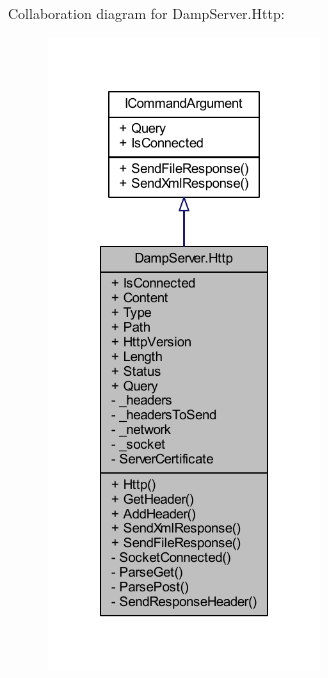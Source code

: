 Collaboration diagram for Damp\-Server.\-Http\-:
\nopagebreak
\begin{figure}[H]
\begin{center}
\leavevmode
\includegraphics[width=204pt]{class_damp_server_1_1_http__coll__graph}
\end{center}
\end{figure}
